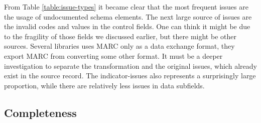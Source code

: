 From Table \ref{table:issue-types} it became clear that the most frequent issues are the usage of undocumented schema elements. The next large source of issues are the invalid codes and values in the control fields. One can think it might be due to the fragility of those fields we discussed earlier, but there might be other sources. Several libraries uses MARC only as a data exchange format, they export MARC from converting some other format. It must be a deeper investigation to separate the transformation and the original issues, which already exist in the source record. The indicator-issues also represents a surprisingly large proportion, while there are relatively less issues in data subfields.   

\subsection{Completeness}

